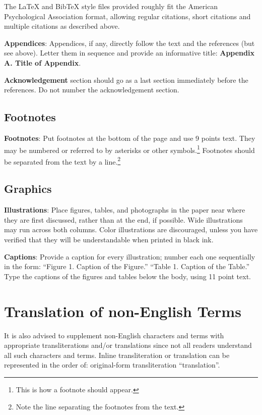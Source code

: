 \documentclass[11pt]{article}
\begin{document}
The \LaTeX{} and Bib\TeX{} style files provided roughly fit the
American Psychological Association format, allowing regular citations, 
short citations and multiple citations as described above.

{\bf Appendices}: Appendices, if any, directly follow the text and the
references (but see above).  Letter them in sequence and provide an
informative title: {\bf Appendix A. Title of Appendix}.

\textbf{Acknowledgement} section should go as a last section immediately
before the references.  Do not number the acknowledgement section.

\subsection{Footnotes}

{\bf Footnotes}: Put footnotes at the bottom of the page and use 9
points text. They may be numbered or referred to by asterisks or other
symbols.\footnote{This is how a footnote should appear.} Footnotes
should be separated from the text by a line.\footnote{Note the line
separating the footnotes from the text.}

\subsection{Graphics}

{\bf Illustrations}: Place figures, tables, and photographs in the
paper near where they are first discussed, rather than at the end, if
possible.  Wide illustrations may run across both columns.  Color
illustrations are discouraged, unless you have verified that  
they will be understandable when printed in black ink.

{\bf Captions}: Provide a caption for every illustration; number each one
sequentially in the form:  ``Figure 1. Caption of the Figure.'' ``Table 1.
Caption of the Table.''  Type the captions of the figures and 
tables below the body, using 11 point text.  

\section{Translation of non-English Terms}

It is also advised to supplement non-English characters and terms
with appropriate transliterations and/or translations
since not all readers understand all such characters and terms.
Inline transliteration or translation can be represented in
the order of: original-form transliteration ``translation''.
\end{document}
